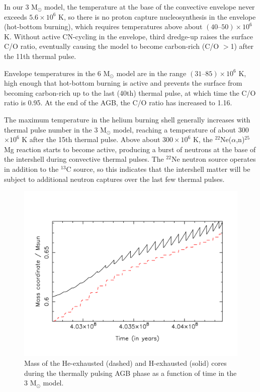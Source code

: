 In our 3 M$_\odot$ model, the temperature at the base of the convective envelope never exceeds $5.6 \times 10^6$ K, so there is no proton capture nucleosynthesis in the envelope (hot-bottom burning), which requires temperatures above about $(40\mbox{--}50) \times 10^6$ K. Without active CN-cycling in the envelope, third dredge-up raises the surface C/O ratio, eventually causing the model to become carbon-rich (C/O $>$1) after the 11th thermal pulse.

Envelope temperatures in the 6 M$_\odot$ model are in the range $(31\mbox{--}85) \times 10^6$ K, high enough that hot-bottom burning is active and prevents the surface from becoming carbon-rich up to the last (40th) thermal pulse, at which time the C/O ratio is 0.95. At the end of the AGB, the C/O ratio has increased to 1.16.

The maximum temperature in the helium burning shell generally increases with thermal pulse number in the 3 M$_\odot$ model, reaching a temperature of about 300 $\times 10^6$ K after the 15th thermal pulse. Above about $300\times 10^6$ K, the $^{22}$Ne($\alpha$,n)$^{25}$Mg reaction starts to become active, producing a burst of neutrons at the base of the intershell during convective thermal pulses. The $^{22}$Ne neutron source operates in addition to the $^{13}$C source, so this indicates that the intershell matter will be subject to additional neutron captures over the last few thermal pulses.

\begin{figure}
 \begin{center}\includegraphics[width=\columnwidth]{figures/m3z01-core-masses.pdf}\end{center}
 \caption{Mass of the He-exhausted (dashed) and H-exhausted (solid) cores during the thermally pulsing AGB phase as a function of time in the 3 M$_\odot$ model.}\label{fig:m3z01-core-masses}
\end{figure}

